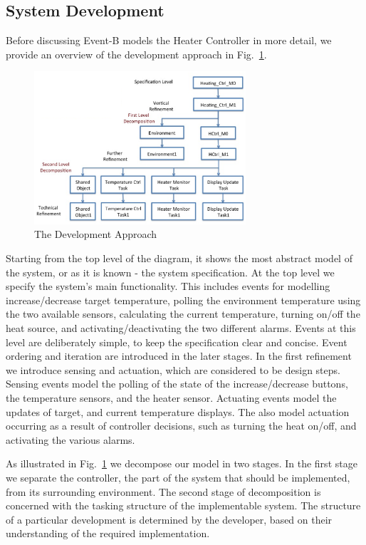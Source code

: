 \subsection{System Development}
%
Before discussing Event-B models the Heater Controller in more detail, we provide an overview of the development approach in Fig.~\ref{fig:devel}.
%
\begin{figure}
	\centering
		\includegraphics[width=0.7\textwidth]{pictures/devel.eps}
	\caption{The Development Approach}
	\label{fig:devel}
\end{figure}
%
Starting from the top level of the diagram, it shows the most abstract model of the system, or as it is known - the system specification. At the top level we specify the system's main functionality. This includes events for modelling increase/decrease target temperature, polling the environment temperature using the two available sensors, calculating the current temperature, turning on/off the heat source, and activating/deactivating the two different alarms. Events at this level are deliberately simple, to keep the specification clear and concise. Event ordering and iteration are introduced in the later stages. In the first refinement we introduce sensing and actuation, which are considered to be design steps. Sensing events model the polling of the state of the increase/decrease buttons, the temperature sensors, and the heater sensor. Actuating events model the updates of target, and current temperature displays. The also model actuation occurring as a result of controller decisions, such as turning the heat on/off, and activating the various alarms. 

As illustrated in Fig.~\ref{fig:devel} we decompose our model in two stages. In the first stage we separate the controller, the part of the system that should be implemented, from its surrounding environment. The second stage of decomposition is concerned with the tasking structure of the implementable system. The structure of a particular development is determined by the developer, based on their understanding of the required implementation.
%
